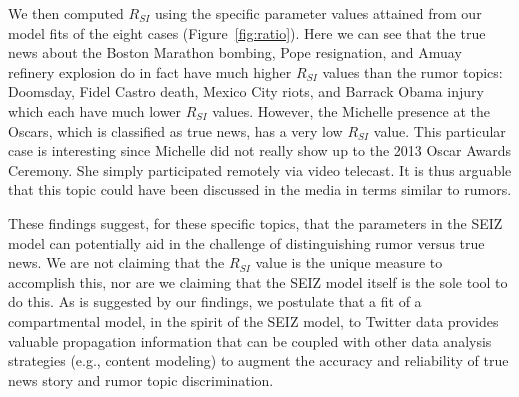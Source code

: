 We then computed $R_{SI}$ using the specific parameter values attained from our model fits of the eight cases (Figure~\ref{fig:ratio}).
Here we can see that the true news about the Boston Marathon bombing, Pope resignation, and Amuay refinery explosion do in fact have much higher $R_{SI}$ values than the rumor topics: Doomsday, Fidel Castro death, Mexico City riots, and Barrack Obama injury which each have much lower $R_{SI}$ values. However, the Michelle presence at the Oscars, which is classified as true news, has a very low $R_{SI}$ value. This particular case is interesting since Michelle did not really show up to the 2013 Oscar Awards Ceremony. She simply participated remotely via video telecast. It is thus arguable that this topic could
have been discussed in the media in terms similar to rumors.

These findings suggest, for these specific topics, that the parameters in the SEIZ model can potentially aid in the challenge of distinguishing rumor versus true news. We are not claiming that the $R_{SI}$ value is the unique measure to accomplish this, nor are we claiming that the SEIZ model itself is the sole tool to do this. As is suggested by our findings, we postulate that a fit of a compartmental model, in the spirit of the SEIZ model, to Twitter data provides valuable propagation information that can be coupled with other data analysis strategies  (e.g., content modeling)
to augment the accuracy and reliability of true news story and rumor topic discrimination.

